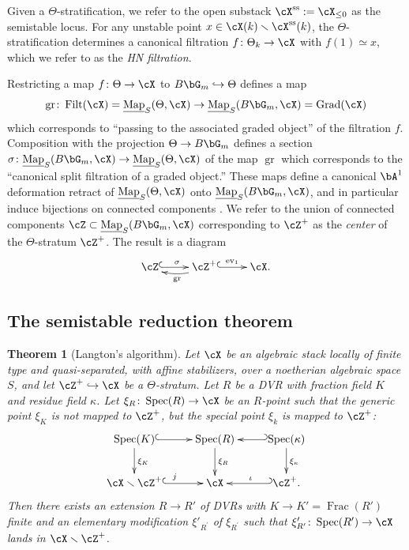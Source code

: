 \documentclass[a4paper]{amsart}
\numberwithin{equation}{section}
\theoremstyle{plain}
\newtheorem{thm}{Theorem}[section]
\theoremstyle{definition}
\DeclareMathOperator{\Spec}{Spec}
\DeclareMathOperator{\ev}{ev}
\DeclareMathOperator{\Frac}{Frac}
\DeclareMathOperator{\Filt}{Filt}
\newcommand{\uMap}{\underline{{\rm Map}}}
\DeclareMathOperator{\Grad}{Grad}
\DeclareMathOperator{\gr}{gr}
\newcommand{\co}{\colon}
\renewcommand{\ss}{{\rm ss}}
\begin{document}

Given a $\Theta$-stratification, we {refer to the open substack} $\cX^{\ss} := \cX_{\leq 0}$ as the semistable locus. For any unstable point $x \in \cX(k) \smallsetminus \cX^{\ss}(k)$, the $\Theta$-stratification determines a canonical filtration $f\co \Theta_{k} \to \cX$ with $f(1) \simeq x$, which we refer to as the \emph{HN filtration}.

Restricting a map $f\co \Theta \to \cX$ to $B \bG_m \hookrightarrow \Theta$ defines a map $$\gr \co \Filt(\cX)=\uMap_S(\Theta,\cX) \to \uMap_S(B\bG_m,\cX) =\Grad(\cX)$$ which corresponds to ``passing to the associated graded object'' of the filtration $f$. Composition with the projection $\Theta \to B\bG_m$ defines a section $\sigma \co \uMap_S(B\bG_m,\cX) \to \uMap_S(\Theta,\cX)$ of the map $\gr$ which corresponds to the ``canonical split filtration of a graded object.'' These maps define a canonical $\bA^1$ deformation retract of $\uMap_S(\Theta,\cX)$ onto $\uMap_S(B\bG_m,\cX)$, and in particular induce bijections on connected components \cite[Lem.~1.3.8]{hlinstability}. We refer to the union of connected components $\cZ \subset \uMap_S(B\bG_m,\cX)$ corresponding to $\cZ^{+}$ as the \emph{center} of the $\Theta$-stratum $\cZ^{+}$. The result is a diagram
\[
\xymatrix{ \cZ \ar@{^(->}[r]^\sigma & \cZ^{+}\ar@/^/[l]^{\gr} \ar@{^(->}[r]^{\ev_1} & \cX.}
\]




\subsection{The semistable reduction theorem}

\begin{thm}[Langton's algorithm]\label{T:Langton-Algorithm}
Let $\cX$ be an algebraic stack locally of finite type and quasi-separated, with affine {stabilizers}, over a noetherian algebraic space $S$, and let $\cZ^{+}\hookrightarrow \cX$ be a $\Theta$-stratum. Let $R$ be a DVR with fraction field $K$ and residue field $\kappa$. 
Let $\xi_{R} \co \Spec(R) \to \cX$ be an $R$-point such that the generic point $\xi_K$ is not mapped to $\cZ^{+}$, but the special point $\xi_k$ is mapped to $\cZ^{+}$: 
	$$\xymatrix{
		\Spec(K) \ar@{^(->}[r]\ar[d]^{\xi_K} & \Spec(R) \ar[d]^{\xi_R} & \Spec(\kappa)\ar@{_(->}[l]\ar[d]^{\xi_{\kappa}} \\
		\cX\smallsetminus \cZ^{+} \ar@{^(->}[r]^{j}& \cX & \ar@{_(->}[l]_{\iota} \cZ^{+}.}$$
Then there exists an extension $R \to R'$ of DVRs with $K \to K'=\Frac(R')$ finite and an elementary modification $\xi'_{R^\prime}$ of $\xi_{R^\prime}$ such that $\xi_{R^\prime}^\prime \co \Spec(R') \to \cX$ lands in $\cX\smallsetminus \cZ^+$. 
\end{thm}
\end{document}
